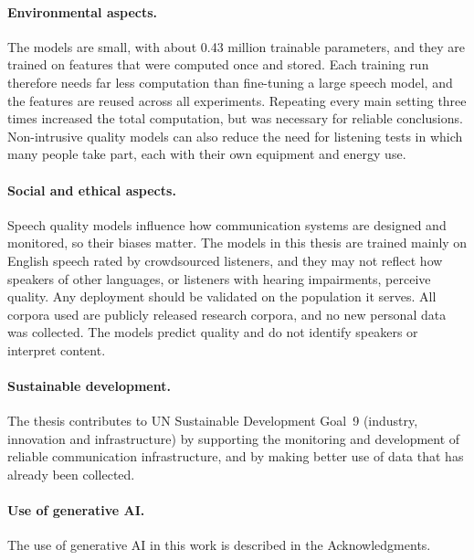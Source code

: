 \documentclass[
english,                 %
bibtex,                  %
includeExtraAbstracts, %
]{kththesis}
\numberwithin{listing}{chapter}
\begin{document}
\paragraph{Environmental aspects.} The models are small, with about 0.43 million trainable parameters, and they are trained on features that were computed once and stored. Each training run therefore needs far less computation than fine-tuning a large speech model, and the features are reused across all experiments. Repeating every main setting three times increased the total computation, but was necessary for reliable conclusions. Non-intrusive quality models can also reduce the need for listening tests in which many people take part, each with their own equipment and energy use.

\paragraph{Social and ethical aspects.} Speech quality models influence how communication systems are designed and monitored, so their biases matter. The models in this thesis are trained mainly on English speech rated by crowdsourced listeners, and they may not reflect how speakers of other languages, or listeners with hearing impairments, perceive quality. Any deployment should be validated on the population it serves. All corpora used are publicly released research corpora, and no new personal data was collected. The models predict quality and do not identify speakers or interpret content.

\paragraph{Sustainable development.} The thesis contributes to UN Sustainable Development Goal~9 (industry, innovation and infrastructure) by supporting the monitoring and development of reliable communication infrastructure, and by making better use of data that has already been collected.

\paragraph{Use of generative AI.} The use of generative AI in this work is described in the Acknowledgments.

\cleardoublepage
\renewcommand{\bibname}{References}


\iftoggle{biblatex}{
    \printbibliography[heading=bibintoc]
}{
    \phantomsection  %
    \addcontentsline{toc}{chapter}{References}
    
}
\end{document}
